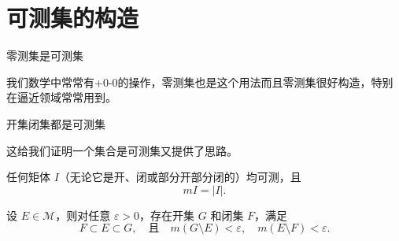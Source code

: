 \documentclass[lang=cn,10pt]{elegantbook}
\begin{document}
\section{可测集的构造}
\begin{theorem}
    零测集是可测集
\end{theorem}
我们数学中常常有+0-0的操作，零测集也是这个用法而且零测集很好构造，特别在逼近领域常常用到。
\begin{corollary}
    开集闭集都是可测集
\end{corollary}
这给我们证明一个集合是可测集又提供了思路。
\begin{theorem}
任何矩体 $I$（无论它是开、闭或部分开部分闭的）均可测，且
\[
mI = |I|.
\]
\end{theorem}
\begin{theorem}[可测集可用开集和闭集逼近]
设 $E \in \mathcal{M}$，则对任意 $\varepsilon > 0$，存在开集 $G$ 和闭集 $F$，满足
\[
F \subset E \subset G, \quad \text{且} \quad m(G \setminus E) < \varepsilon, \quad m(E \setminus F) < \varepsilon.
\]
\end{theorem}
\end{document}
